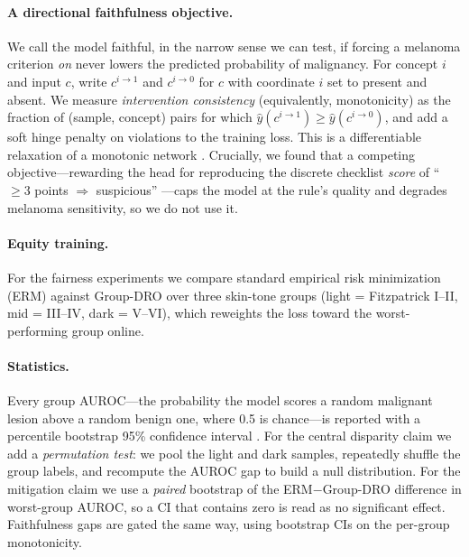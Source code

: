 \documentclass[pmlr,twocolumn,10pt]{jmlr}
\begin{document}
\paragraph{A directional faithfulness objective.}
We call the model faithful, in the narrow sense we can test, if forcing a
melanoma criterion \emph{on} never lowers the predicted probability of
malignancy. For concept $i$ and input $c$, write $c^{i\rightarrow 1}$ and
$c^{i\rightarrow 0}$ for $c$ with coordinate $i$ set to present and absent. We
measure \emph{intervention consistency} (equivalently, monotonicity) as the
fraction of (sample, concept) pairs for which
$\hat{y}(c^{i\rightarrow 1}) \ge \hat{y}(c^{i\rightarrow 0})$, and add a soft
hinge penalty on violations to the training loss. This is a differentiable
relaxation of a monotonic network \citep{sill1998monotonic}. Crucially, we
found that a competing objective---rewarding the head for reproducing the
discrete checklist \emph{score} of ``$\ge 3$ points $\Rightarrow$ suspicious''
\citep{argenziano1998epiluminescence}---caps the model at the rule's quality and
degrades melanoma sensitivity, so we do not use it.

\paragraph{Equity training.}
For the fairness experiments we compare standard empirical risk minimization
(ERM) against Group-DRO \citep{sagawa2020distributionally} over three skin-tone
groups (light = Fitzpatrick I--II, mid = III--IV, dark = V--VI), which reweights
the loss toward the worst-performing group online.

\paragraph{Statistics.}
Every group AUROC---the probability the model scores a random malignant lesion
above a random benign one, where 0.5 is chance---is reported with a percentile
bootstrap 95\% confidence interval \citep{efron1994introduction}. For the central disparity claim we add a
\emph{permutation test}: we pool the light and dark samples, repeatedly shuffle
the group labels, and recompute the AUROC gap to build a null distribution. For
the mitigation claim we use a \emph{paired} bootstrap of the ERM$-$Group-DRO
difference in worst-group AUROC, so a CI that contains zero is read as no
significant effect. Faithfulness gaps are gated the same way, using bootstrap
CIs on the per-group monotonicity.
\end{document}
